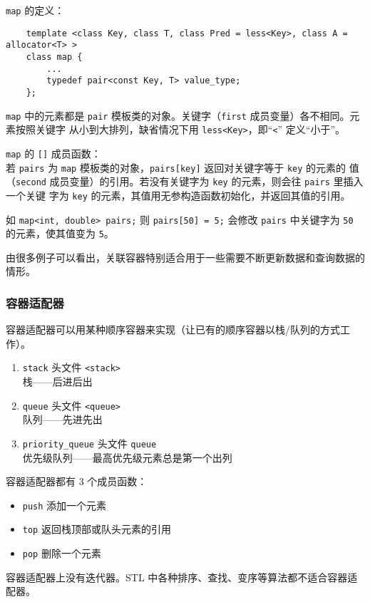\documentclass[UTF8]{ctexart}
\begin{document}
\texttt{map} 的定义：
\begin{verbatim}
    template <class Key, class T, class Pred = less<Key>, class A = allocator<T> >
    class map {
        ...
        typedef pair<const Key, T> value_type;
    };
\end{verbatim}
\texttt{map} 中的元素都是 \texttt{pair} 模板类的对象。关键字（\texttt{first} 成员变量）各不相同。元素按照关键字
从小到大排列，缺省情况下用 \texttt{less<Key>}，即“\texttt{<}” 定义“小于”。

\texttt{map} 的 \texttt{[]} 成员函数：\\
若 \texttt{pairs} 为 \texttt{map} 模板类的对象，\texttt{pairs[key]} 返回对关键字等于 \texttt{key} 的元素的
值（\texttt{second} 成员变量）的引用。若没有关键字为 \texttt{key} 的元素，则会往 \texttt{pairs} 里插入一个关键
字为 \texttt{key} 的元素，其值用无参构造函数初始化，并返回其值的引用。

如 \texttt{map<int, double> pairs;} 则 \texttt{pairs[50] = 5;} 会修改 \texttt{pairs}
中关键字为 \texttt{50} 的元素，使其值变为 \texttt{5}。

由很多例子可以看出，关联容器特别适合用于一些需要不断更新数据和查询数据的情形。

\subsubsection{容器适配器}
容器适配器可以用某种顺序容器来实现（让已有的顺序容器以栈/队列的方式工作）。
\begin{enumerate}
    \item \texttt{stack} 头文件 \texttt{<stack>} \\
    栈——后进后出
    \item \texttt{queue} 头文件 \texttt{<queue>} \\
    队列——先进先出
    \item \texttt{priority\_queue} 头文件 \texttt{queue} \\
    优先级队列——最高优先级元素总是第一个出列
\end{enumerate}

容器适配器都有 3 个成员函数：
\begin{itemize}
    \item \texttt{push} 添加一个元素
    \item \texttt{top} 返回栈顶部或队头元素的引用
    \item \texttt{pop} 删除一个元素
\end{itemize}

容器适配器上没有迭代器。STL 中各种排序、查找、变序等算法都不适合容器适配器。
\end{document}
